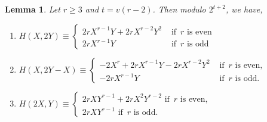 \documentclass[11pt, reqno]{amsart}
\numberwithin{equation}{section}
\newtheorem{lemma}[thm]{Lemma}
\theoremstyle{definition}
\theoremstyle{remark}
\theoremstyle{definition}
\theoremstyle{remark}
\theoremstyle{remark}
\begin{document}
\begin{lemma}\label{Heven}
Let $r\geq 3$ and $t=v(r-2)$. Then modulo $2^{t+2}$, we have, 
\begin{enumerate}
	\item $H(X,2Y) \equiv 
    \begin{cases}
    2rX^{r-1}Y + 2rX^{r-2}Y^2 &\text{ if }\, r \text{ is even}\\
    2rX^{r-1}Y &\text{ if }\, r \text{ is odd}    
    \end{cases}
    $ \label{Heven1}
	\item $H(X,2Y-X) \equiv \begin{cases}
-2X^{r}+2rX^{r-1}Y-2rX^{r-2}Y^2 & \text{ if }\, r \text{ is even,}\\
 -2rX^{r-1}Y & \text{ if }\, r \text{ is odd.}
    \end{cases}$    
    \label{Heven2}
	\item $H(2X,Y) \equiv \begin{cases}
2rXY^{r-1} + 2rX^2Y^{r-2} \text{ if }\, r \text{ is even,}\\
2rXY^{r-1} \text{ if }\, r \text{ is odd.}
	\end{cases}$ \label{Heven3}
\end{enumerate}
\end{lemma}
\end{document}
